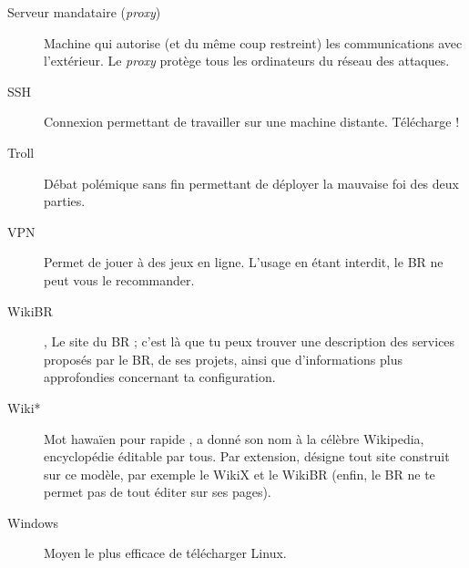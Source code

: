 \begin{description}
  \item[Serveur mandataire (\emph{proxy})] Machine qui autorise
(et du même coup restreint) les communications avec l'extérieur. Le \emph{proxy} protège tous les ordinateurs du réseau des attaques.
  \item[SSH] Connexion permettant de travailler sur une machine distante. Télécharge  !
  \item[Troll] Débat polémique sans fin permettant de déployer la mauvaise foi des deux parties.
  \item[VPN] Permet de jouer à des jeux en ligne. L'usage en étant interdit, le BR ne peut vous le recommander.
  \item[WikiBR] , Le site du BR ; c'est là que tu peux trouver une description des services proposés par le BR, de ses projets, ainsi que
  d'informations plus approfondies concernant ta configuration.
  \item[Wiki*] Mot hawaïen pour \og rapide \fg, a donné son nom à la célèbre Wikipedia, encyclopédie éditable par tous.
  Par extension, d\'esigne tout site construit sur ce mod\`ele, par exemple le WikiX et le WikiBR (enfin, le BR ne te permet pas de tout \'editer sur ses pages).
  \item[Windows] Moyen le plus efficace de télécharger Linux.
\end{description}
